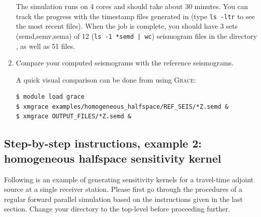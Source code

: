 \documentclass[10pt,fleqn,letterpaper]{article}
\newcommand{\grace}{\textsc{Grace}}
\begin{document}
\begin{enumerate}
The simulation runs on 4 cores and should take about 30 minutes. You can track the progress with the timestamp files generated in  (type \lstinline{ls -ltr} to see the most recent files). When the job is complete, you should have 3 sets (semd,semv,sema) of 12 (\lstinline{ls -1 *semd | wc}) seismogram files in the directory , as well as 51  files.

\item Compare your computed seismograms with the reference seismograms.

A quick visual comparison can be done from  using \grace:
\begin{lstlisting}
$ module load grace
$ xmgrace examples/homogeneous_halfspace/REF_SEIS/*Z.semd &
$ xmgrace OUTPUT_FILES/*Z.semd &
\end{lstlisting}

\end{enumerate}


\subsection*{Step-by-step instructions, example 2: homogeneous halfspace sensitivity kernel}
Following is an example of generating sensitivity kernels for a travel-time adjoint source at a single receiver station. Please first go through the procedures of a regular forward parallel simulation based on the instructions given in the last section. Change your directory to the top-level  before proceeding further.
\end{document}
